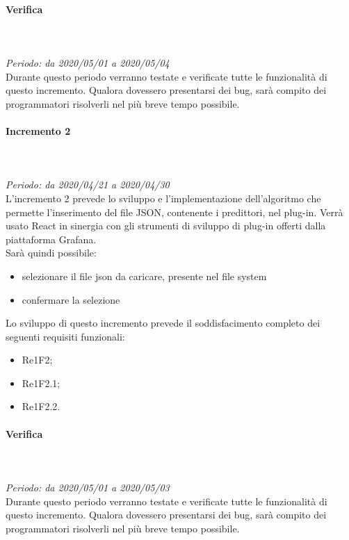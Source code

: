 \paragraph*{Verifica}\mbox{} \\ \mbox{} \\ 
\textit{Periodo: da 2020/05/01 a 2020/05/04}\\
Durante questo periodo verranno testate e verificate tutte le funzionalità di questo incremento. Qualora dovessero presentarsi dei bug\glo, sarà compito dei programmatori risolverli nel più breve tempo possibile.

\paragraph{Incremento 2}\mbox{} \\ \mbox{} \\ 
\textit{Periodo: da 2020/04/21 a 2020/04/30}\\
L’incremento 2 prevede lo sviluppo e l’implementazione dell'algoritmo che permette l'inserimento del file JSON, contenente i predittori, nel plug-in. Verrà usato React in sinergia con gli strumenti di sviluppo di plug-in offerti dalla piattaforma Grafana. \\
Sarà quindi possibile:
\begin{itemize}
	\item selezionare il file json da caricare, presente nel file system
	\item confermare la selezione
\end{itemize}
Lo sviluppo di questo incremento prevede il soddisfacimento completo dei seguenti requisiti funzionali:
\begin{itemize}
\item Re1F2;
\item Re1F2.1;
\item Re1F2.2.
\end{itemize}
\paragraph*{Verifica}\mbox{} \\ \mbox{} \\ 
\textit{Periodo: da 2020/05/01 a 2020/05/03}\\
Durante questo periodo verranno testate e verificate tutte le funzionalità di questo incremento. Qualora dovessero presentarsi dei bug, sarà compito dei programmatori risolverli nel più breve tempo possibile.

